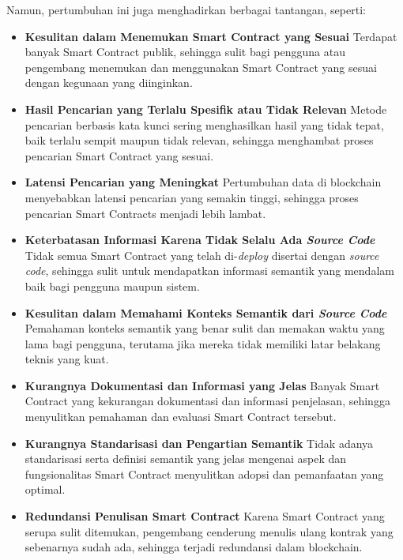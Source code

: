Namun, pertumbuhan ini juga menghadirkan berbagai tantangan, seperti:
\begin{itemize}
	\item \textbf{Kesulitan dalam Menemukan Smart Contract yang Sesuai} \newline
	      Terdapat banyak Smart Contract publik, sehingga sulit bagi pengguna atau pengembang menemukan dan menggunakan Smart Contract yang sesuai dengan kegunaan yang diinginkan.
	\item \textbf{Hasil Pencarian yang Terlalu Spesifik atau Tidak Relevan} \newline
	      Metode pencarian berbasis kata kunci sering menghasilkan hasil yang tidak tepat, baik terlalu sempit maupun tidak relevan, sehingga menghambat proses pencarian Smart Contract yang sesuai.
	\item \textbf{Latensi Pencarian yang Meningkat} \newline
	      Pertumbuhan data di blockchain menyebabkan latensi pencarian yang semakin tinggi, sehingga proses pencarian Smart Contracts menjadi lebih lambat.
	\item \textbf{Keterbatasan Informasi Karena Tidak Selalu Ada \textit{Source Code}} \newline
	      Tidak semua Smart Contract yang telah di-\textit{deploy} disertai dengan \textit{source code}, sehingga sulit untuk mendapatkan informasi semantik yang mendalam baik bagi pengguna maupun sistem.
	\item \textbf{Kesulitan dalam Memahami Konteks Semantik dari \textit{Source Code}} \newline
		  Pemahaman konteks semantik yang benar sulit dan memakan waktu yang lama bagi pengguna, terutama jika mereka tidak memiliki latar belakang teknis yang kuat.
	\item \textbf{Kurangnya Dokumentasi dan Informasi yang Jelas} \newline
	      Banyak Smart Contract yang kekurangan dokumentasi dan informasi penjelasan, sehingga menyulitkan pemahaman dan evaluasi Smart Contract tersebut.
	\item \textbf{Kurangnya Standarisasi dan Pengartian Semantik} \newline
	      Tidak adanya standarisasi serta definisi semantik yang jelas mengenai aspek dan fungsionalitas Smart Contract menyulitkan adopsi dan pemanfaatan yang optimal.
	\item \textbf{Redundansi Penulisan Smart Contract} \newline
	      Karena Smart Contract yang serupa sulit ditemukan, pengembang cenderung menulis ulang kontrak yang sebenarnya sudah ada, sehingga terjadi redundansi dalam blockchain.

\end{itemize}
